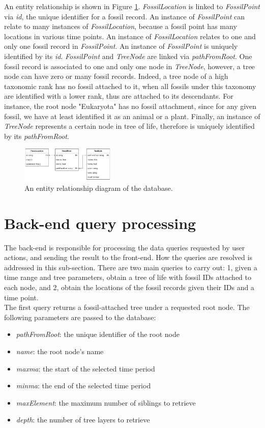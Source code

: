 \documentclass[11pt, a4paper,oneside,chapterprefix=false]{scrbook}
\begin{document}
An entity relationship is shown in Figure \ref{fig:er}. \emph{FossilLocation} is linked to \emph{FossilPoint} via \emph{id}, the unique identifier for a fossil record. An instance of \emph{FossilPoint} can relate to many instances of \emph{FossilLocation}, because a fossil point has many locations in various time points. An instance of \emph{FossilLocation} relates to one and only one fossil record in \emph{FossilPoint}. An instance of \emph{FossilPoint} is uniquely identified by its \emph{id}. \emph{FossilPoint} and \emph{TreeNode} are linked via \emph{pathFromRoot}. One fossil record is associated to one and only one node in \emph{TreeNode}, however, a tree node can have zero or many fossil records. Indeed, a tree node of a high taxonomic rank has no fossil attached to it, when all fossils under this taxonomy are identified with a lower rank, thus are attached to its descendants. For instance, the root node "Eukaryota" has no fossil attachment, since for any given fossil, we have at least identified it as an animal or a plant. Finally, an instance of \emph{TreeNode} represents a certain node in tree of life, therefore is uniquely identified by its \emph{pathFromRoot}.
\begin{figure}[h]
	\centering
	\includegraphics[width=0.4\textwidth]{figures/technical_solution/er}
	\caption{An entity relationship diagram of the database.}
	\label{fig:er}
\end{figure}

\section{Back-end query processing} \label{sec:tec_backend}
The back-end is responsible for processing the data queries requested by user actions, and sending the result to the front-end. How the queries are resolved is addressed in this sub-section. There are two main queries to carry out: 1, given a time range and tree parameters, obtain a tree of life with fossil IDs attached to each node, and 2, obtain the locations of the fossil records given their IDs and a time point. \\

The first query returns a fossil-attached tree under a requested root node. The following parameters are passed to the database: 
\begin{itemize}
	\item \textit{pathFromRoot}: the unique identifier of the root node
	\item \textit{name}: the root node's name
	\item \textit{maxma}: the start of the selected time period
	\item \textit{minma}: the end of the selected time period
	\item \textit{maxElement}: the maximum number of siblings to retrieve
	\item \textit{depth}: the number of tree layers to retrieve 
\end{itemize}
\end{document}
